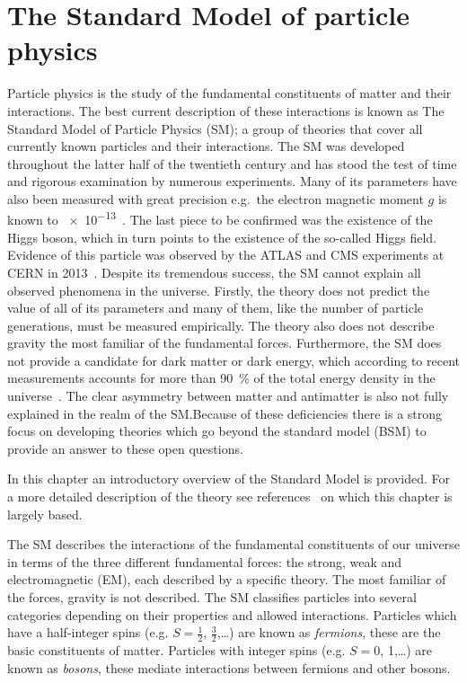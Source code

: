 \newcommand\scalemath[2]{\scalebox{#1}{\mbox{\ensuremath{\displaystyle #2}}}}
\chapter{The Standard Model of particle physics}\label{ch:Theory}

Particle physics is the study of the fundamental constituents of matter and their interactions. The best current description of these interactions is known as The Standard Model of Particle Physics (SM); a group of theories that cover all currently known particles and their interactions. The SM was developed throughout the latter half of the twentieth century and has stood the test of time and rigorous examination by numerous experiments. Many of its parameters have also been measured with great precision e.g.\ the electron magnetic moment $g$ is known to \num{e-13}~\cite{Theory:AwesomeSM}. The last piece to be confirmed was the existence of the Higgs boson, which in turn points to the existence of the so-called Higgs field. Evidence of this particle was observed by the ATLAS and CMS experiments at CERN in 2013~\cite{Theory:HiggsDiscoveryATLAS,Theory:HiggsDiscoveryCMS}.
Despite its tremendous success, the SM cannot explain all observed phenomena in the universe. Firstly, the theory does not predict the value of all of its parameters and many of them, like the number of particle generations, must be measured empirically. The theory also does not describe gravity the most familiar of the fundamental forces. Furthermore, the SM does not provide a candidate for dark matter or dark energy, which according to recent measurements accounts for more than \SI{90}{\percent} of the total energy density in the universe~\cite{Theory:DarkMatter}. The clear asymmetry between matter and antimatter is also not fully explained in the realm of the SM.\@ Because of these deficiencies there is a strong focus on developing theories which go beyond the standard model (BSM) to provide an answer to these open questions.

In this chapter an introductory overview of the Standard Model is provided. For a more detailed description of the theory see references~\cite{Theory:Perkins,Theory:IntroGriffiths} on which this chapter is largely based.

The SM describes the interactions of the fundamental constituents of our universe in terms of the three different fundamental forces: the strong, weak and electromagnetic (EM), each described by a specific theory. The most familiar of the forces, gravity is not described. The SM classifies particles into several categories depending on their properties and allowed interactions. Particles which have a half-integer spins (e.g. $S=\frac{1}{2}$, $\frac{3}{2}$,\ldots) are known as \emph{fermions}, these are the basic constituents of matter. Particles with integer spins (e.g. $S=0$, 1,\ldots) are known as \emph{bosons}, these mediate interactions between fermions and other bosons.

